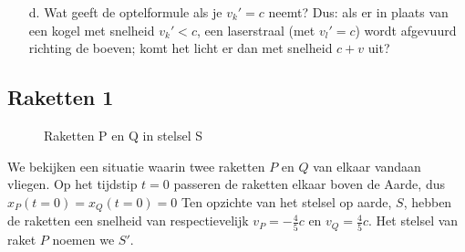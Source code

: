 \begin{itemize}
	\item [d.]
  Wat  geeft de optelformule als je $v_k'=c$ neemt? 
Dus: als er in plaats van een kogel met snelheid $v_k' < c$, een laserstraal (met $v_l' = c$) wordt afgevuurd richting de boeven; 
  komt het licht er dan met snelheid $c + v$ uit?
\end{itemize}


\subsection{Raketten 1}\label{prob:rak3}

 \begin{figure} [h]
 \begin{center}
 \mbox{\epsfxsize=10cm}
 \caption{Raketten P en Q in stelsel S}
 \label{f:raktt}
 \end{center}
 \end{figure}

	
	We bekijken een situatie waarin twee raketten $P$ en $Q$ van elkaar vandaan vliegen. Op het tijdstip $t=0$ passeren de raketten elkaar boven de Aarde, dus $x_P(t=0) = x_Q(t=0) =0$ Ten opzichte van het stelsel op aarde, $S$, hebben de raketten een snelheid van respectievelijk $v_P = -\frac{4}{5} c$ en $v_Q = \frac{4}{5} c$. Het stelsel van raket $P$ noemen we $S'$.

	
		
